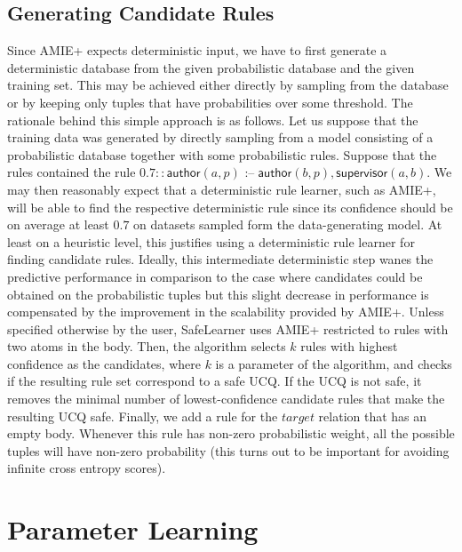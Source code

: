 \documentclass[akbc,twoside,11pt]{article}
\newcommand{\algorithmname}{SafeLearner\xspace}
\begin{document}
\subsection{Generating Candidate Rules} \label{sub:crg} Since AMIE+ expects deterministic input, we have to first generate a deterministic database from the given probabilistic database and the given training set. This may be achieved either directly by sampling from the database or by keeping only tuples that have probabilities over some threshold. The rationale behind this simple approach is as follows. Let us suppose that the training data was generated by directly sampling from a model consisting of a probabilistic database together with some probabilistic rules. Suppose that the rules contained the rule $0.7 :: \mathsf{author}(a,p) \mbox{ :--}\; \mathsf{author}(b,p), \mathsf{supervisor}(a,b)$. We may then reasonably expect that a deterministic rule learner, such as AMIE+, will be able to find the respective deterministic rule since its confidence should be on average at least $0.7$ on datasets sampled form the data-generating model. At least on a heuristic level, this justifies using a deterministic rule learner for finding candidate rules. Ideally, this intermediate deterministic step wanes the predictive performance in comparison to the case where candidates could be obtained on the probabilistic tuples \cite{DBLP:conf/ijcai/RaedtDTBV15} but this slight decrease in performance is compensated by the improvement in the scalability provided by AMIE+. Unless specified otherwise by the user, \algorithmname uses AMIE+ restricted to rules with two atoms in the body.
Then, the algorithm selects $k$ rules with highest confidence as the candidates, where $k$ is a parameter of the algorithm, and checks if the resulting rule set correspond to a safe UCQ. If the UCQ is not safe, it removes the minimal number of lowest-confidence candidate rules that make the resulting UCQ safe. Finally, we add a rule for the $target$ relation that has an empty body. Whenever this rule has non-zero probabilistic weight, all the possible tuples will have non-zero probability (this turns out to be important for avoiding infinite cross entropy scores).

\section{Parameter Learning}
\label{sec:parameter_learning}

\end{document}
